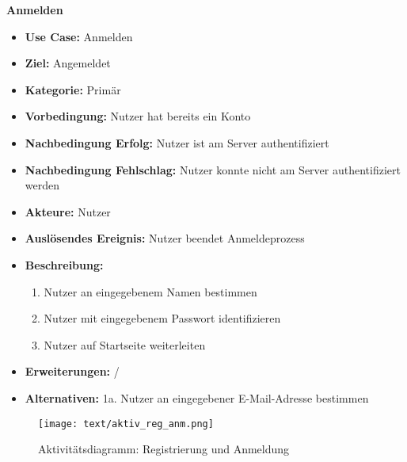 \textbf{Anmelden}
\begin{itemize}
	\item \textbf{Use Case:} Anmelden
	\item \textbf{Ziel:} Angemeldet
	\item \textbf{Kategorie:} Primär
	\item \textbf{Vorbedingung:} Nutzer hat bereits ein Konto
	\item \textbf{Nachbedingung Erfolg:} Nutzer ist am Server authentifiziert
	\item \textbf{Nachbedingung Fehlschlag:} Nutzer konnte nicht am Server authentifiziert werden
	\item \textbf{Akteure:} Nutzer
	\item \textbf{Auslösendes Ereignis:} Nutzer beendet Anmeldeprozess
	\item \textbf{Beschreibung:} \begin{enumerate}
		\item Nutzer an eingegebenem Namen bestimmen
		\item Nutzer mit eingegebenem Passwort identifizieren
		\item Nutzer auf Startseite weiterleiten
	\end{enumerate}
	\item \textbf{Erweiterungen:} /
	\item \textbf{Alternativen:} 1a. Nutzer an eingegebener E-Mail-Adresse bestimmen
\end{itemize}
\clearpage
\begin{figure}[h!]
	\centering
	\texttt{[image: text/aktiv\_reg\_anm.png]}
	\caption{Aktivitätsdiagramm: Registrierung und Anmeldung}
	\label{ak_reg_anm}
\end{figure}


